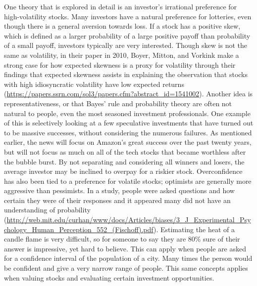 \documentclass[12pt,twoside]{reedthesis}
\theoremstyle{definition}
\theoremstyle{definition}
\theoremstyle{definition}
\theoremstyle{remark}
\begin{document}
One theory that is explored in detail is an investor's irrational
preference for high-volatility stocks. Many investors have a natural
preference for lotteries, even though there is a general aversion
towards loss. If a stock has a positive skew, which is defined as a
larger probability of a large positive payoff than probability of a
small payoff, investors typically are very interested. Though skew is
not the same as volatility, in their paper in 2010, Boyer, Mitton, and
Vorkink make a strong case for how expected skewness is a proxy for
volatility through their findings that expected skewness assists in
explaining the observation that stocks with high idiosyncratic
volatility have low expected returns
(\url{https://papers.ssrn.com/sol3/papers.cfm?abstract_id=1541002}).
Another idea is representativeness, or that Bayes' rule and probability
theory are often not natural to people, even the most seasoned
investment professionals. One example of this is selectively looking at
a few speculative investments that have turned out to be massive
successes, without considering the numerous failures. As mentioned
earlier, the news will focus on Amazon's great success over the past
twenty years, but will not focus as much on all of the tech stocks that
became worthless after the bubble burst. By not separating and
considering all winners and losers, the average investor may be inclined
to overpay for a riskier stock. Overconfidence has also been tied to a
preference for volatile stocks; optimists are generally more aggressive
than pessimists. In a study, people were asked questions and how certain
they were of their responses and it appeared many did not have an
understanding of probability
(\url{http://web.mit.edu/curhan/www/docs/Articles/biases/3_J_Experimental_Psychology_Human_Perception_552_(Fischoff).pdf}).
Estimating the heat of a candle flame is very difficult, so for someone
to say they are 80\% sure of their answer is impressive, yet hard to
believe. This can apply when people are asked for a confidence interval
of the population of a city. Many times the person would be confident
and give a very narrow range of people. This same concepts applies when
valuing stocks and evaluating certain investment opportunities.
\end{document}
